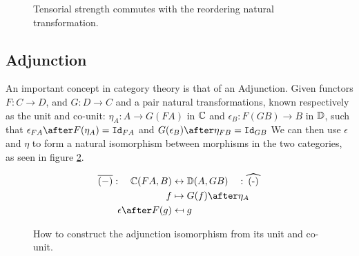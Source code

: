\documentclass{Report}
\begin{document}
\begin{figure}
    \centering
    \begin{framed}
        \begin{minipage}{0.45\textwidth}
        \end{minipage}
    \end{framed}
    \caption{Tensorial strength commutes with the reordering natural transformation.}
    \label{TensorStrengthAlpha}
\end{figure}






\subsection{Adjunction}\label{WhatsAnAdjunction}
An important concept in category theory is that of an Adjunction. Given functors $F: C\rightarrow D$, and  $G: D\rightarrow C$ and a pair natural transformations, known respectively as the unit and co-unit: $\eta_A: A \rightarrow G(F A)$ in $\mathbb{C}$ and $\epsilon_B: F(G B) \rightarrow B$ in $\mathbb{D}$, such that $\epsilon_{F A}\after F(\eta_A) = \Id{F A}$ and $G(\epsilon_B)\after \eta_{F B} = \Id{G B}$ We can then use $\epsilon$ and $\eta$ to form a natural isomorphism between morphisms in the two categories, as seen in figure \ref{Adjunction}.


\begin{figure}
    \begin{framed}
    \begin{align}
        \bar{(-)}: \quad\C(FA, B) &\leftrightarrow \DC(A, GB)   \quad: \widehat{(-)}\\
        f & \mapsto G(f)\after\eta_A \\
        \epsilon\after F(g) & \mapsfrom g\\
    \end{align}
    \end{framed}
    \caption{How to construct the adjunction isomorphism from its unit and co-unit.}
    \label{Adjunction}
\end{figure}
\end{document}
